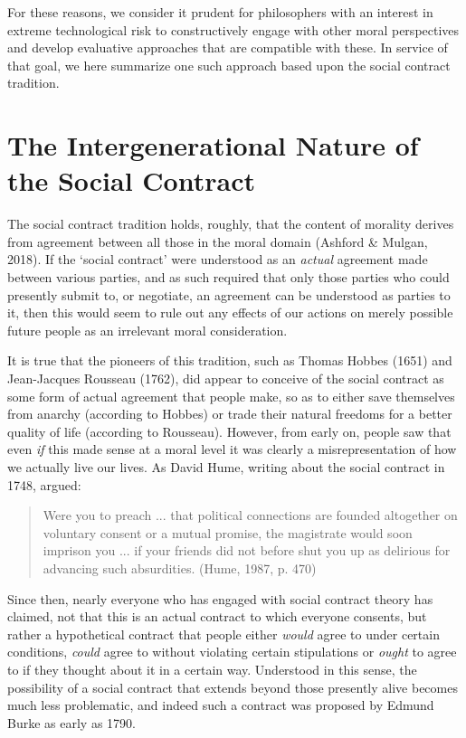 \documentclass[man,11pt,a4paper]{apa7}
\begin{document}
For these reasons, we consider it prudent for philosophers with an interest in extreme technological risk to constructively engage with other moral perspectives and develop evaluative approaches that are compatible with these. In service of that goal, we here summarize one such approach based upon the social contract tradition.

\section{The Intergenerational Nature of the Social Contract}

The social contract tradition holds, roughly, that the content of morality derives from agreement between all those in the moral domain (Ashford \& Mulgan, 2018). If the `social contract' were understood as an \textit{actual} agreement made between various parties, and as such required that only those parties who could presently submit to, or negotiate, an agreement can be understood as parties to it, then this would seem to rule out any effects of our actions on merely possible future people as an irrelevant moral consideration.

It is true that the pioneers of this tradition, such as Thomas Hobbes (1651) and Jean-Jacques Rousseau (1762), did appear to conceive of the social contract as some form of actual agreement that people make, so as to either save themselves from anarchy (according to Hobbes) or trade their natural freedoms for a better quality of life (according to Rousseau). However, from early on, people saw that even \textit{if} this made sense at a moral level it was clearly a misrepresentation of how we actually live our lives. As David Hume, writing about the social contract in 1748, argued:

\begin{quote}
Were you to preach ... that political connections are founded altogether on voluntary consent or a mutual promise, the magistrate would soon imprison you ... if your friends did not before shut you up as delirious for advancing such absurdities. (Hume, 1987, p. 470)
\end{quote}

Since then, nearly everyone who has engaged with social contract theory has claimed, not that this is an actual contract to which everyone consents, but rather a hypothetical contract that people either \textit{would} agree to under certain conditions, \textit{could} agree to without violating certain stipulations or \textit{ought} to agree to if they thought about it in a certain way. Understood in this sense, the possibility of a social contract that extends beyond those presently alive becomes much less problematic, and indeed such a contract was proposed by Edmund Burke as early as 1790.
\end{document}
